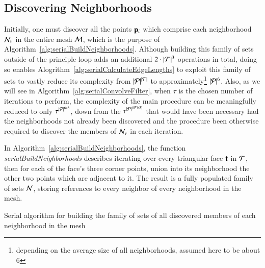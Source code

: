 \subsection{Discovering Neighborhoods}
\label{ch5sSIssDN}
Initially, one must discover all the points $\mathbf{p}_i$ which comprise each neighborhood $\mathcal{N}_v$ in the entire mesh $\mathcal{M}$, which is the purpose of Algorithm~\ref{alg:serialBuildNeighborhoods}. Although building this family of sets outside of the principle loop adds an additional $2\cdot |\mathcal{T}|^3$ operations in total, doing so enables Alogrithm~\ref{alg:serialCalculateEdgeLengths} to exploit this family of sets to vastly reduce its complexity from $|\mathcal{P}|^{|\mathcal{T}|}$ to approximately\footnote{depending on the average size of all neighborhoods, assumed here to be about 6} $|\mathcal{P}|^6$. Also, as we will see in Algorithm~\ref{alg:serialConvolveFilter}, when $\tau$ is the chosen number of iterations to perform, the complexity of the main procedure can be meaningfully reduced to only $\tau^{|\mathcal{P}|^{6*3}}$, down from the $\tau^{|\mathcal{P}|^{(|\mathcal{F}|*3)}}$ that would have been necessary had the neighborhoods not already been discovered and the procedure been otherwise required to discover the members of $\mathcal{N}_v$ in each iteration.%
%

In Algorithm~\ref{alg:serialBuildNeighborhoods}, the function \textit{serialBuildNeighborhoods} describes iterating over every triangular face $\mathbf{t}$ in $\mathcal{T}$, then for each of the face's three corner points, union into its neighborhood the other two points which are adjacent to it. The result is a fully populated family of sets $\mathcal{N}$, storing references to every neighbor of every neighborhood in the mesh.

\begin{algorithm}[ht]
	\DontPrintSemicolon


	\bigskip
\nl	{}

	\bigskip
\nl	{}
	\caption{Serial algorithm for building the family of sets of all discovered members of each neighborhood in the mesh\label{alg:serialBuildNeighborhoods}}
\end{algorithm}%

